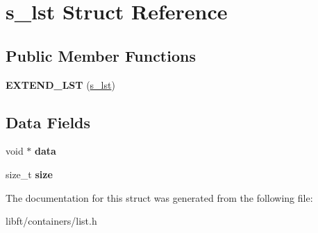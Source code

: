 \hypertarget{structs__lst}{}\section{s\+\_\+lst Struct Reference}
\label{structs__lst}
\subsection*{Public Member Functions}
\begin{DoxyCompactItemize}
\item 
\hypertarget{structs__lst_ab63623b85dc687cf4dbe277d3d718972}{}{\bfseries E\+X\+T\+E\+N\+D\+\_\+\+L\+S\+T} (\hyperlink{structs__lst}{s\+\_\+lst})\label{structs__lst_ab63623b85dc687cf4dbe277d3d718972}

\end{DoxyCompactItemize}
\subsection*{Data Fields}
\begin{DoxyCompactItemize}
\item 
\hypertarget{structs__lst_a735984d41155bc1032e09bece8f8d66d}{}void $\ast$ {\bfseries data}\label{structs__lst_a735984d41155bc1032e09bece8f8d66d}

\item 
\hypertarget{structs__lst_a854352f53b148adc24983a58a1866d66}{}size\+\_\+t {\bfseries size}\label{structs__lst_a854352f53b148adc24983a58a1866d66}

\end{DoxyCompactItemize}


The documentation for this struct was generated from the following file\+:\begin{DoxyCompactItemize}
\item 
libft/containers/list.\+h\end{DoxyCompactItemize}
